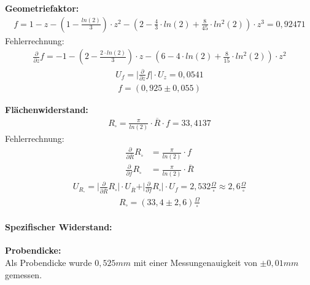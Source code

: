 \documentclass[a4paper]{scrartcl}
\numberwithin{equation}{subsection}
\begin{document}
\textbf{Geometriefaktor:}\\
\begin{align}
f = 1 - z - \left( 1-\frac{ln(2)}{3}\right)  \cdot z^2 - \left( 2 - \frac{4}{3} \cdot ln(2) + \frac{8}{45} \cdot ln^2(2)\right) \cdot z^3 = 0,92471
\end{align}
Fehlerrechnung:
\begin{align*}
\frac{\partial}{\partial z} f = -1 -\left( 2-\frac{2\cdot ln(2)}{3}\right)  \cdot z -\left( 6 - 4 \cdot ln(2) + \frac{8}{15} \cdot ln^2(2)\right) \cdot z^2
\end{align*}
\begin{align*}
U_{f} = \vert \frac{\partial}{\partial z} f \vert \cdot U_{z} = 0,0541
\end{align*}
\begin{align*}
f = (0,925 \pm 0,055)
\end{align*}

\textbf{Flächenwiderstand:}\\
\begin{align}
R_{\square} = \frac{\pi}{ln(2)} \cdot \overline{R} \cdot f = 33,4137
\end{align}
Fehlerrechnung:
\begin{align*}
\frac{\partial}{\partial \overline{R}} R_{\square} &= \frac{\pi}{ln(2)} \cdot f \\
\frac{\partial}{\partial f} R_{\square} &= \frac{\pi}{ln(2)} \cdot \overline{R}
\end{align*}
\begin{align*}
U_{R_{\square}} = \vert \frac{\partial}{\partial \overline{R}} R_{\square}  \vert \cdot U_{\overline{R}} + \vert \frac{\partial}{\partial f} R_{\square} \vert \cdot U_{f} = 2,532 \frac{\Omega}{\square} \approx 2,6 \frac{\Omega}{\square}
\end{align*}
\begin{align*}
R_{\square} = (33,4 \pm 2,6)\frac{\Omega}{\square}
\end{align*}


\paragraph{Spezifischer Widerstand:\\}

\textbf{Probendicke:\\}
Als Probendicke wurde $0,525mm$ mit einer Messungenauigkeit von $\pm 0,01mm$ gemessen.
\end{document}
